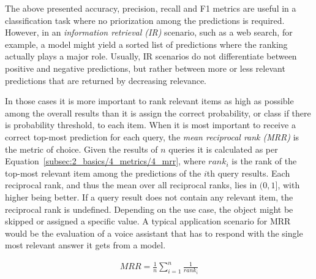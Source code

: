 The above presented accuracy, precision, recall and F1 metrics are useful in a classification task where no priorization among the predictions is required. However, in an \emph{information retrieval (IR)} scenario, such as a web search, for example, a model might yield a sorted list of predictions where the ranking actually plays a major role. Usually, IR scenarios do not differentiate between positive and negative predictions, but rather between more or less relevant predictions that are returned by decreasing relevance.

In those cases it is more important to rank relevant items as high as possible among the overall results than it is assign the correct probability, or class if there is probability threshold, to each item. When it is most important to receive a correct top-most prediction for each query, the \emph{mean reciprocal rank (MRR)} is the metric of choice. Given the results of $n$ queries it is calculated as per Equation~\ref{subsec:2_basics/4_metrics/4_mrr}, where $rank_i$ is the rank of the top-most relevant item among the predictions of the $i$th query results. Each reciprocal rank, and thus the mean over all reciprocal ranks, lies in $(0, 1]$, with higher being better. If a query result does not contain any relevant item, the reciprocal rank is undefined. Depending on the use case, the object might be skipped or assigned a specific value. A typical application scenario for MRR would be the evaluation of a voice assistant that has to respond with the single most relevant answer it gets from a model.

\begin{align}
    MRR = \frac{1}{n} \sum_{i=1}^{n} \frac{1}{rank_i}
    \label{eq:2_basics/4_metrics/4_mrr/mrr}
\end{align}

